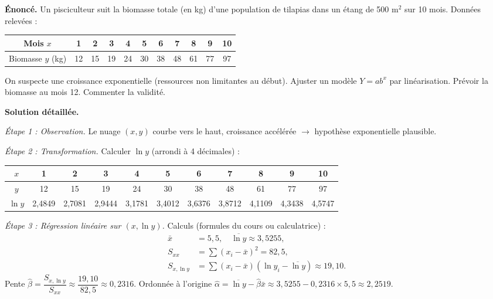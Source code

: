 \documentclass[11pt]{article}
\begin{document}
\begin{exoresolu}
\textbf{Énoncé.} Un pisciculteur suit la biomasse totale (en kg) d'une population de tilapias dans un étang de 500 m$^2$ sur 10 mois. Données relevées :

\begin{center}
\begin{tabular}{|c|cccccccccc|}\hline
Mois $x$ & 1 & 2 & 3 & 4 & 5 & 6 & 7 & 8 & 9 & 10 \\ \hline
Biomasse $y$ (kg) & 12 & 15 & 19 & 24 & 30 & 38 & 48 & 61 & 77 & 97 \\ \hline
\end{tabular}
\end{center}

On suspecte une croissance exponentielle (ressources non limitantes au début). Ajuster un modèle $Y = a b^{x}$ par linéarisation. Prévoir la biomasse au mois 12. Commenter la validité.

\textbf{Solution détaillée.}

\textit{Étape 1 : Observation.} Le nuage $(x, y)$ courbe vers le haut, croissance accélérée $\to$ hypothèse exponentielle plausible.

\textit{Étape 2 : Transformation.} Calculer $\ln y$ (arrondi à 4 décimales) :

\begin{center}
\begin{tabular}{|c|cccccccccc|}\hline
$x$ & 1 & 2 & 3 & 4 & 5 & 6 & 7 & 8 & 9 & 10 \\ \hline
$y$ & 12 & 15 & 19 & 24 & 30 & 38 & 48 & 61 & 77 & 97 \\ \hline
$\ln y$ & 2,4849 & 2,7081 & 2,9444 & 3,1781 & 3,4012 & 3,6376 & 3,8712 & 4,1109 & 4,3438 & 4,5747 \\ \hline
\end{tabular}
\end{center}

\textit{Étape 3 : Régression linéaire sur $(x, \ln y)$.}
Calculs (formules du cours ou calculatrice) :
\begin{align*}
\bar{x} &= 5,5, \quad \overline{\ln y} \approx 3,5255, \\
S_{xx} &= \sum (x_i - \bar{x})^2 = 82,5, \\
S_{x,\ln y} &= \sum (x_i - \bar{x})(\ln y_i - \overline{\ln y}) \approx 19,10.
\end{align*}
Pente $\hat{\beta} = \dfrac{S_{x,\ln y}}{S_{xx}} \approx \dfrac{19,10}{82,5} \approx 0,2316$.
Ordonnée à l'origine $\hat{\alpha} = \overline{\ln y} - \hat{\beta}\bar{x} \approx 3,5255 - 0,2316 \times 5,5 \approx 2,2519$.


\end{exoresolu}
\end{document}
